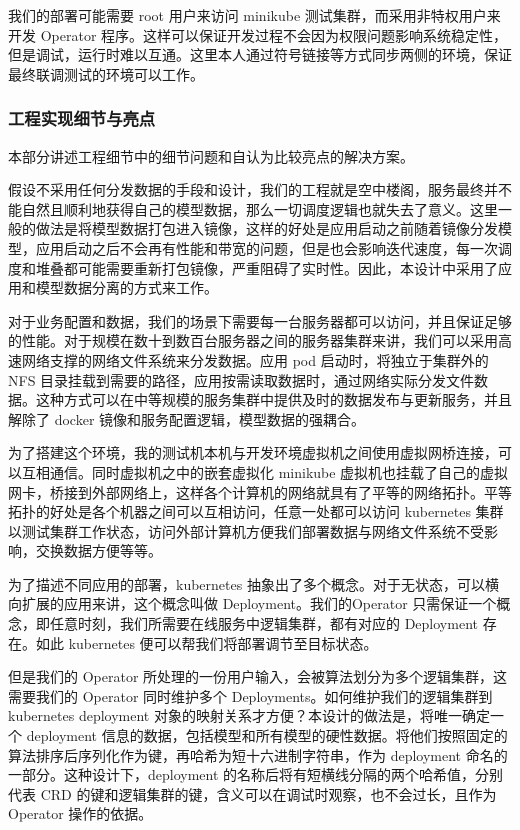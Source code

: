 
我们的部署可能需要 root 用户来访问 minikube 测试集群，而采用非特权用户来开发 Operator 程序。这样可以保证开发过程不会因为权限问题影响系统稳定性，但是调试，运行时难以互通。这里本人通过符号链接等方式同步两侧的环境，保证最终联调测试的环境可以工作。

\subsubsection{工程实现细节与亮点}

本部分讲述工程细节中的细节问题和自认为比较亮点的解决方案。


假设不采用任何分发数据的手段和设计，我们的工程就是空中楼阁，服务最终并不能自然且顺利地获得自己的模型数据，那么一切调度逻辑也就失去了意义。这里一般的做法是将模型数据打包进入镜像，这样的好处是应用启动之前随着镜像分发模型，应用启动之后不会再有性能和带宽的问题，但是也会影响迭代速度，每一次调度和堆叠都可能需要重新打包镜像，严重阻碍了实时性。因此，本设计中采用了应用和模型数据分离的方式来工作。

对于业务配置和数据，我们的场景下需要每一台服务器都可以访问，并且保证足够的性能。对于规模在数十到数百台服务器之间的服务器集群来讲，我们可以采用高速网络支撑的网络文件系统来分发数据。应用 pod 启动时，将独立于集群外的 NFS 目录挂载到需要的路径，应用按需读取数据时，通过网络实际分发文件数据。这种方式可以在中等规模的服务集群中提供及时的数据发布与更新服务，并且解除了 docker 镜像和服务配置逻辑，模型数据的强耦合。


为了搭建这个环境，我的测试机本机与开发环境虚拟机之间使用虚拟网桥连接，可以互相通信。同时虚拟机之中的嵌套虚拟化 minikube 虚拟机也挂载了自己的虚拟网卡，桥接到外部网络上，这样各个计算机的网络就具有了平等的网络拓扑。平等拓扑的好处是各个机器之间可以互相访问，任意一处都可以访问 kubernetes 集群以测试集群工作状态，访问外部计算机方便我们部署数据与网络文件系统不受影响，交换数据方便等等。


为了描述不同应用的部署，kubernetes 抽象出了多个概念。对于无状态，可以横向扩展的应用来讲，这个概念叫做 Deployment。我们的Operator 只需保证一个概念，即任意时刻，我们所需要在线服务中逻辑集群，都有对应的 Deployment 存在。如此 kubernetes 便可以帮我们将部署调节至目标状态。

但是我们的 Operator 所处理的一份用户输入，会被算法划分为多个逻辑集群，这需要我们的 Operator 同时维护多个 Deployments。如何维护我们的逻辑集群到 kubernetes deployment 对象的映射关系才方便？本设计的做法是，将唯一确定一个 deployment 信息的数据，包括模型和所有模型的硬性数据。将他们按照固定的算法排序后序列化作为键，再哈希为短十六进制字符串，作为 deployment 命名的一部分。这种设计下，deployment 的名称后将有短横线分隔的两个哈希值，分别代表 CRD 的键和逻辑集群的键，含义可以在调试时观察，也不会过长，且作为 Operator 操作的依据。

